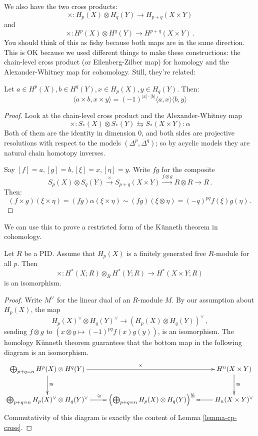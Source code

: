 We also have the two cross products:
\[
\times: H_p(X)\otimes H_q(Y)\to H_{p+q}(X\times Y)
\]
and
\[\times: H^p(X)\otimes H^q(Y)\to H^{p+q}(X\times Y)\,.
\]
You should think of this as fishy because both maps are in the same direction.
This is OK because we used different things to make these constructions:
the chain-level cross product (or Eilenberg-Zilber map) 
for homology and the Alexander-Whitney map for
cohomology. Still, they're related:
\begin{lemma}
\label{lemma-cp-cross}
Let $a\in H^p(X),b\in H^q(Y),x\in H_p(X), y\in H_q(Y)$. Then:
\begin{equation*}
\langle a\times b,x\times y\rangle=(-1)^{|x|\cdot |b|}\langle a,x\rangle\langle b,y\rangle
\end{equation*}
\end{lemma}
\begin{proof}
Look at the chain-level cross product and the Alexander-Whitney map
\[
\times:S_*(X)\otimes S_*(Y)\leftrightarrows S_*(X\times Y):\alpha
\]
Both of them are the identity in dimension 0, 
and both sides are projective resolutions with respect to the models
$(\Delta^p,\Delta^q)$; so by acyclic models they are natural chain 
homotopy inverses. 

Say $[f]=a,[g]=b,[\xi]=x,[\eta]=y$. Write 
$fg$ for the composite 
\[
S_p(X)\otimes S_q(Y)\xrightarrow{\times}S_{p+q}(X\times Y)
\xrightarrow{f\otimes g}R\otimes R\to R\,.
\]
Then:
\[
(f\times g)(\xi\times\eta)=(fg)\alpha(\xi\times\eta)\sim(fg)(\xi\otimes\eta) 
=(-q)^{pq}f(\xi)g(\eta)\,.
\]
\end{proof}

We can use this to prove a restricted form of the K\"unneth theorem in 
cohomology.
\begin{theorem}
Let $R$ be a PID. Assume that $H_p(X)$ is a finitely generated free $R$-module
for all $p$. Then 
\[
\times:H^\ast(X;R)\otimes_RH^\ast(Y;R)\to H^\ast(X\times Y;R)
\]
is an isomorphism. 
\end{theorem}
\begin{proof}
Write $M^\vee$ for the linear dual of an $R$-module $M$. 
By our assumption about $H_p(X)$, the map
\[
H_p(X)^\vee\otimes H_q(Y)^\vee\to\left(H_p(X)\otimes H_q(Y)\right)^\vee\,,
\]
sending $f\otimes g$ to $(x\otimes y\mapsto(-1)^{pq}f(x)g(y))$,
is an isomorphism. The homology K\"unneth theorem guarantees that the 
bottom map in the following diagram is an isomorphism.
\[
\xymatrix{
\bigoplus_{p+q=n}H^p(X)\otimes H^q(Y) \ar[rr]^\times\ar[d]^\cong && 
H^n(X\times Y) \ar[d]^\cong \\
\bigoplus_{p+q=n}H_p(X)^\vee\otimes H_q(Y)^\vee \ar[r]^\cong &
\left(\bigoplus_{p+q=n}H_p(X)\otimes H_q(Y)\right)^\vee &
H_n(X\times Y)^\vee \ar[l]_\cong
}\]
Commutativity of this diagram is exactly the content of 
Lemma \ref{lemma-cp-cross}. 
\end{proof}

